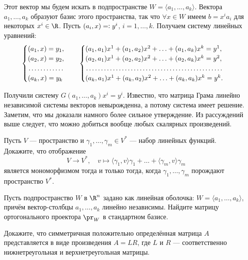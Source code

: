\begin{solution}
    Этот вектор мы будем искать в подпространстве $W = \langle a_1, \ldots, a_k\rangle$. Вектора $a_1, \ldots, a_k$ образуют базис этого пространства, так что $\forall x \in W$ имеем $b = x^ia_i$ для некоторых $x^i \in \R$. Пусть $(a_i, x) = \vcentcolon y^i$, $i = 1, \ldots, k$. Получаем систему линейных уравнений:
    \[
        \begin{cases}
            (a_1, x) = y_1,\\
            (a_2, x) = y_2,\\
            \dotfill\\
            (a_k, x) = y_k
        \end{cases}\quad
        \begin{cases}
            (a_1, a_1)x^1 + (a_1, a_2)x^2 + \ldots + (a_1, a_k)x^k = y^1,\\
            (a_2, a_1)x^1 + (a_2, a_2)x^2 + \ldots + (a_2, a_k)x^k = y^2,\\
            \dotfill\\
            (a_k, a_1)x^1 + (a_k, a_2)x^2 + \ldots + (a_k, a_k)x^k = y^k.
        \end{cases}
    \]

    Получили систему $G(a_1, \ldots, a_k)x^i = y^i$. Известно, что матрица Грама линейно независимой системы векторов невырожденна, а потому система имеет решение. Заметим, что мы доказали намного более сильное утверждение. Из рассуждений выше следует, что можно добиться вообще любых скалярных произведений.
\end{solution}

\begin{problem}
    Пусть $V$ --- пространство и $\gamma_1, \ldots, \gamma_m \in V^\ast$ --- набор линейных функций. Докажите, что отображение
    \[
        V \to V^\ast,\quad v \mapsto \langle\gamma_1, v\rangle\gamma_1 + \ldots + \langle\gamma_m, v\rangle\gamma_m
    \]
    является мономорфизмом тогда и только тогда, когда $\gamma_1, \ldots, \gamma_m$ порождают пространство $V^\ast$.
\end{problem}

\begin{problem}
    Пусть подпространство $W$ в $\R^n$ задано как линейная оболочка: $W = \langle a_1, \ldots, a_k\rangle$, причём вектор-столбцы $a_1, \ldots, a_k$ линейно независимы. Найдите матрицу ортогонального проектора $\pr_W$ в стандартном базисе.
\end{problem}

\begin{problem}
    Докажите, что симметричная положительно определённая матрица $A$ представляется в виде произведения $A = LR$, где $L$ и $R$ --- соответственно нижнетреугольная и верхнетреугольная матрицы.
\end{problem}


